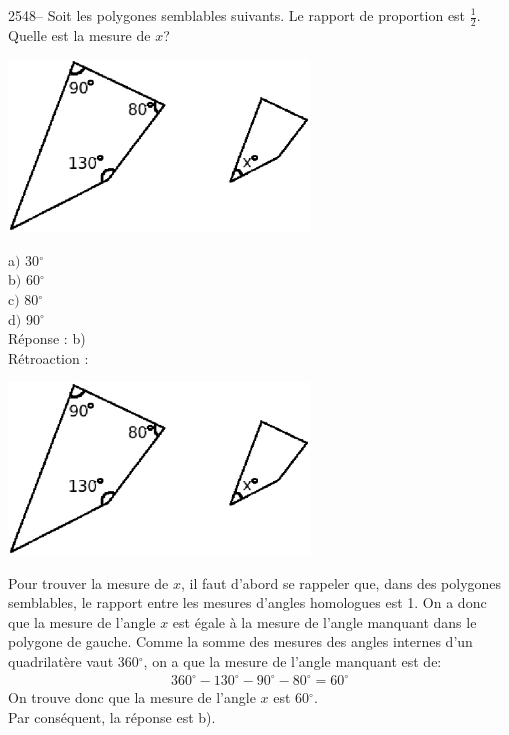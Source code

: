 \documentclass[letterpaper, 12pt]{article}
\begin{document}
2548-- Soit les polygones semblables suivants. Le rapport de proportion est $\frac{1}{2}$. Quelle est la mesure de $x$?\\
\begin{center}
 \includegraphics[width=8cm,bb=14 14 458 285]{Q2548.eps}
\end{center}
a$)$  30$^{\circ}$ \\
b$)$  60$^{\circ}$ \\
c$)$  80$^{\circ}$ \\
d$)$  90$^{\circ}$ \\

R\'eponse : b)\\

R\'etroaction :\\
\begin{center}
 \includegraphics[width=8cm,bb=14 14 458 285]{Q2548.eps}
\end{center}
Pour trouver la mesure de $x$, il faut d'abord se rappeler que, dans des polygones semblables, le rapport entre les mesures d'angles homologues est 1. On a donc que la mesure de l'angle $x$ est \'egale \`a la mesure de l'angle manquant dans le polygone de gauche. Comme la somme des mesures des angles internes d'un quadrilat\`ere vaut 360$^{\circ}$, on a que la mesure de l'angle manquant est de:
\begin{eqnarray*}
  360^{\circ}-130^{\circ}-90^{\circ}-80^{\circ}=60^{\circ}
\end{eqnarray*}
On trouve donc que la mesure de l'angle $x$ est 60$^{\circ}$.\\
Par cons\'equent, la r\'eponse est b).\\
\end{document}
